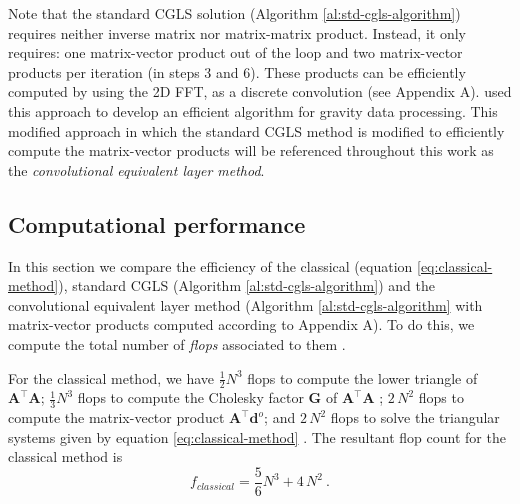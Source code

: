 \documentclass[manuscript,noblind]{geophysics}
\begin{document}
Note that the standard CGLS solution (Algorithm \ref{al:std-cgls-algorithm}) requires 
neither inverse matrix nor matrix-matrix product. Instead, it only requires: one matrix-vector 
product out of the loop and two matrix-vector products per iteration (in steps 3 and 6). 
These products can be efficiently computed by using the 2D FFT, as a discrete convolution
(see Appendix A). \citet{takahashi2020convolutional} used this approach
to develop an efficient algorithm for gravity data processing. This modified approach in which
the standard CGLS method is modified to efficiently compute the matrix-vector products will be 
referenced throughout this work as the \textit{convolutional equivalent layer method}.

\subsection{Computational performance}

In this section we compare the efficiency of the classical (equation \ref{eq:classical-method}), 
standard CGLS (Algorithm \ref{al:std-cgls-algorithm}) and the convolutional equivalent 
layer method (Algorithm \ref{al:std-cgls-algorithm} with matrix-vector products computed 
according to Appendix A). To do this, we compute the total number of 
\textit{flops} associated to them \citep[][ p. 12]{golub-vanloan2013}.

For the classical method, we have $\tfrac{1}{2} N^3$ flops to compute the lower triangle of
$\mathbf{A}^{\top}\mathbf{A}$; $\tfrac{1}{3} N^3$ flops to compute the Cholesky factor
$\mathbf{G}$ of $\mathbf{A}^{\top}\mathbf{A}$ \citep[][ p.~164]{golub-vanloan2013};
$2 \, N^2$ flops to compute the matrix-vector product $\mathbf{A}^{\top} \mathbf{d}^{o}$;
and $2 \, N^2$ flops to solve the triangular systems given by equation \ref{eq:classical-method}
\citep[][ p.~106]{golub-vanloan2013}. The resultant flop count for the classical method is
\begin{equation}
	f_{classical} =  \dfrac{5}{6} N^{3} + 4 \, N^{2}\: .
	\label{eq:flops-classical-method}
\end{equation}

\end{document}
